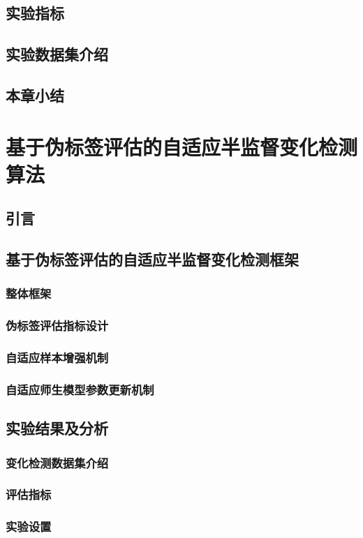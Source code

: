 \documentclass[lang=chs, degree=master, blindreview=false, adobe=false]{yanputhesis}
\begin{document}
\section{实验指标}
\section{实验数据集介绍}
\section{本章小结}

\chapter{基于伪标签评估的自适应半监督变化检测算法}
\section{引言}
\section{基于伪标签评估的自适应半监督变化检测框架}
\subsection{整体框架}
\subsection{伪标签评估指标设计}
\subsection{自适应样本增强机制}
\subsection{自适应师生模型参数更新机制}
\section{实验结果及分析}
\subsection{变化检测数据集介绍}
\subsection{评估指标}
\subsection{实验设置}
\end{document}
